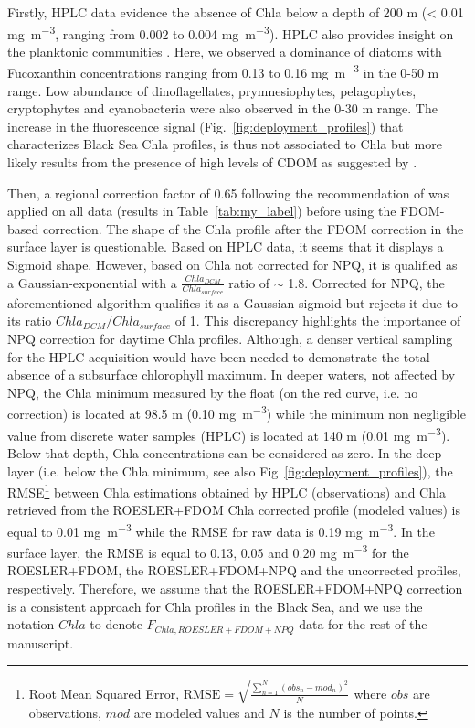 \documentclass[journal abbreviation, manuscript]{copernicus}
\begin{document}
Firstly, HPLC data evidence the absence of Chla below a depth of 200 \unit{m} (< 0.01 \unit{mg~m^{-3}}, ranging from 0.002 to 0.004 \unit{mg~m^{-3}}). HPLC also provides insight on the planktonic communities \citep{ioccgplankton}. Here, we observed a dominance of diatoms with Fucoxanthin concentrations ranging from 0.13 to 0.16 \unit{mg~m^{-3}} in the 0-50 \unit{m} range. Low abundance of dinoflagellates, prymnesiophytes, pelagophytes, cryptophytes and cyanobacteria were also observed in the 0-30 m range.
The increase in the fluorescence signal (Fig.~\ref{fig:deployment_profiles}) that characterizes Black Sea Chla profiles, is thus not associated to Chla but more likely results from the presence of high levels of CDOM as suggested by \citet{Xing2017}. 

Then, a regional correction factor of 0.65 following the recommendation of \citet{Roesler2017} was applied on all data (results in Table~\ref{tab:my_label}) before using the FDOM-based correction. The shape of the Chla profile after the FDOM correction in the surface layer is questionable.
Based on HPLC data, it seems that it displays a Sigmoid shape. However, based on Chla not corrected for NPQ, it is qualified as a Gaussian-exponential with a $\frac{Chla_{DCM}}{Chla_{surface}}$ ratio of $\sim$ 1.8.
Corrected for NPQ, the aforementioned algorithm qualifies it as a Gaussian-sigmoid but rejects it due to its ratio $Chla_{DCM}/Chla_{surface}$ of 1. This discrepancy highlights the importance of NPQ correction for daytime Chla profiles. %
Although, a denser vertical sampling for the HPLC acquisition would have been needed to demonstrate the total absence of a subsurface chlorophyll maximum. %
In deeper waters, not affected by NPQ, the Chla minimum measured by the float (on the red curve, i.e. no correction) is located at 98.5 \unit{m} (0.10 \unit{mg~m^{-3}}) while the minimum non negligible value from discrete water samples (HPLC) is located at 140 \unit{m} (0.01 \unit{mg~m^{-3}}). Below that depth, Chla concentrations can be considered as zero. In the deep layer (i.e. below the Chla minimum, see also Fig~\ref{fig:deployment_profiles}), the RMSE\footnote{Root Mean Squared Error, $\mathrm{RMSE} =\sqrt{\frac{\sum_{n=1}^{N}(obs_{n} - mod_{n})^{2}}{N}}$ where $obs$ are observations, $mod$ are modeled values and $N$ is the number of points.} between Chla estimations obtained by HPLC (observations) and Chla retrieved from the ROESLER+FDOM Chla corrected profile (modeled values) is equal to 0.01 \unit{mg~m^{-3}} while the RMSE for raw data is 0.19 \unit{mg~m^{-3}}.
In the surface layer, the RMSE is equal to 0.13, 0.05 and 0.20 \unit{mg~m^{-3}} for the ROESLER+FDOM, the ROESLER+FDOM+NPQ and the uncorrected profiles, respectively.
Therefore, we assume that the ROESLER+FDOM+NPQ correction is a consistent approach for Chla profiles in the Black Sea, and we use the notation $Chla$ to denote $F_{Chla, ROESLER+FDOM+NPQ}$ data for the rest of the manuscript. 
\end{document}
